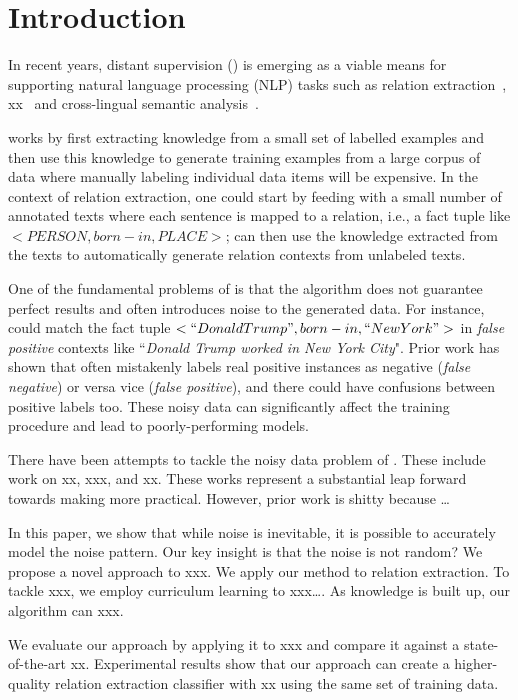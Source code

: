\section{Introduction}

In recent years, distant supervision (\DS) is emerging as a viable means for
supporting natural language processing (NLP) tasks such as
relation extraction~\cite{mintz2009distant}, xx~\cite{} and cross-lingual
semantic analysis~\cite{fang2016learning}.

\DS works by first extracting knowledge from a small set of labelled examples
and then use this knowledge to generate training examples from a large corpus
of data where manually labeling individual data items will be
expensive. In the context of relation extraction, one could start by
feeding \DS with a small number of annotated texts where each sentence is
mapped to a relation, i.e., a fact tuple like $<PERSON, born-in, PLACE>$;
\DS can then use the knowledge extracted from the texts to automatically
generate relation contexts from unlabeled texts.

One of the fundamental problems of \DS is that the algorithm does not
guarantee perfect results and often introduces noise to the generated data.
For instance, \DS could match the fact tuple $<``Donald Trump", born-in,
``New York">$  in \emph{false positive} contexts like ``\emph{Donald Trump
worked in New York City}". Prior work has shown that \DS often mistakenly
labels real positive instances as negative (\emph{false negative}) or versa
vice (\emph{false positive}), and there could have confusions between
positive labels too. These noisy data can significantly affect the training
procedure and lead to poorly-performing models.

There have been attempts to tackle the noisy data problem of \DS. These
include work on xx, xxx, and xx. These works represent a substantial leap
forward towards making \DS more practical. However, prior work is shitty
because …

In this paper, we show that while noise is inevitable, it is possible to
accurately model the noise pattern. Our key insight is that the noise is not
random? We propose a novel approach to xxx. We apply our method to relation
extraction. To tackle xxx, we employ curriculum learning to xxx…. As
knowledge is built up, our algorithm can xxx.

We evaluate our approach by applying it to xxx and compare it against a
state-of-the-art xx. Experimental results show that our approach can create a
higher-quality relation extraction classifier with xx%
using the same set of training data.
